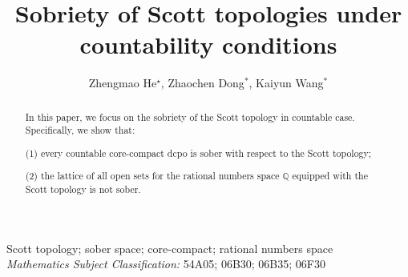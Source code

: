 \documentclass[preprint,12pt]{elsarticle}
\numberwithin{equation}{section}
\begin{document}
\begin{frontmatter}



\title{Sobriety of Scott topologies under countability conditions}


\author{Zhengmao He$^\star$, Zhaochen Dong$^*$, Kaiyun Wang$^*$}
\address{$^\star$School of Sciences, Southwest Petroleum University,Chengdu 610500,Sichuan China}
\address{$^{*}$School of Mathematics and Statistics, Shaanxi Normal University, Xi'an 710119, Shaanxi, China}

\begin{abstract} In this paper, we focus on the sobriety of the Scott topology in countable case. Specifically, we show that:

(1) every countable core-compact dcpo is sober with respect to the Scott topology;

(2) the lattice of all open sets for the rational numbers space $\mathbb{Q}$ equipped with the Scott topology is not sober.
\end{abstract}
\begin{keyword}  Scott topology; sober space; core-compact; rational numbers space\\
\vspace*{0.2cm}
{\em Mathematics Subject Classification:} 54A05; 06B30; 06B35; 06F30
\end{keyword}


\end{frontmatter}
\end{document}
